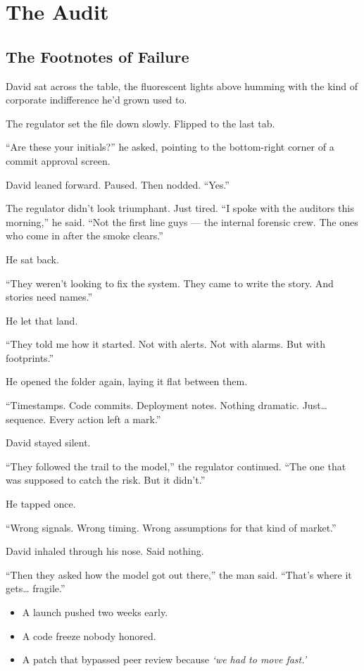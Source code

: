
\section{The Audit}

\subsection{The Footnotes of Failure}

David sat across the table, the fluorescent lights above humming with the kind of corporate indifference he’d grown used to.

The regulator set the file down slowly. Flipped to the last tab.

“Are these your initials?” he asked, pointing to the bottom-right corner of a commit approval screen.

David leaned forward. Paused. Then nodded.
“Yes.”

The regulator didn’t look triumphant. Just tired.
“I spoke with the auditors this morning,” he said. “Not the first line guys — the internal forensic crew. The ones who come in after the smoke clears.”

He sat back.

“They weren’t looking to fix the system. They came to write the story. And stories need names.”

He let that land.

“They told me how it started. Not with alerts. Not with alarms. But with footprints.”

He opened the folder again, laying it flat between them.

“Timestamps. Code commits. Deployment notes. Nothing dramatic. Just… sequence. Every action left a mark.”

David stayed silent.

“They followed the trail to the model,” the regulator continued. “The one that was supposed to catch the risk. But it didn’t.”

He tapped once.

“Wrong signals. Wrong timing. Wrong assumptions for that kind of market.”

David inhaled through his nose. Said nothing.

“Then they asked how the model got out there,” the man said. “That’s where it gets… fragile.”

\begin{itemize}
\item A launch pushed two weeks early.
\item A code freeze nobody honored.
\item A patch that bypassed peer review because \textit{‘we had to move fast.’}
\end{itemize}

